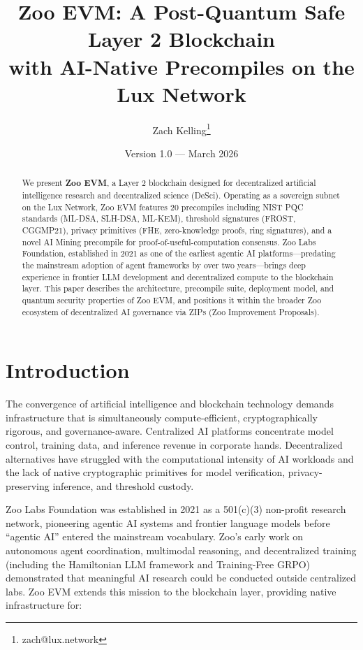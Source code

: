 \documentclass[11pt,a4paper]{article}
\title{\textbf{Zoo EVM: A Post-Quantum Safe Layer 2 Blockchain\\with AI-Native Precompiles on the Lux Network}}
\author[1]{Zach Kelling\thanks{zach@lux.network}}
\affil[1]{\textit{Zoo Labs Foundation \quad Hanzo Industries \quad Lux Industries}, \texttt{research@zoo.ngo}}
\date{Version 1.0 --- March 2026}
\begin{document}
\zoocoverpage

\begin{abstract}
We present \textbf{Zoo EVM}, a Layer 2 blockchain designed for decentralized artificial intelligence research and decentralized science (DeSci). Operating as a sovereign subnet on the Lux Network, Zoo EVM features 20 precompiles including NIST PQC standards (ML-DSA, SLH-DSA, ML-KEM), threshold signatures (FROST, CGGMP21), privacy primitives (FHE, zero-knowledge proofs, ring signatures), and a novel AI Mining precompile for proof-of-useful-computation consensus. Zoo Labs Foundation, established in 2021 as one of the earliest agentic AI platforms---predating the mainstream adoption of agent frameworks by over two years---brings deep experience in frontier LLM development and decentralized compute to the blockchain layer. This paper describes the architecture, precompile suite, deployment model, and quantum security properties of Zoo EVM, and positions it within the broader Zoo ecosystem of decentralized AI governance via ZIPs (Zoo Improvement Proposals).
\end{abstract}

\section{Introduction}

The convergence of artificial intelligence and blockchain technology demands infrastructure that is simultaneously compute-efficient, cryptographically rigorous, and governance-aware. Centralized AI platforms concentrate model control, training data, and inference revenue in corporate hands. Decentralized alternatives have struggled with the computational intensity of AI workloads and the lack of native cryptographic primitives for model verification, privacy-preserving inference, and threshold custody.

Zoo Labs Foundation was established in 2021 as a 501(c)(3) non-profit research network, pioneering agentic AI systems and frontier language models before ``agentic AI'' entered the mainstream vocabulary. Zoo's early work on autonomous agent coordination, multimodal reasoning, and decentralized training (including the Hamiltonian LLM framework and Training-Free GRPO) demonstrated that meaningful AI research could be conducted outside centralized labs. Zoo EVM extends this mission to the blockchain layer, providing native infrastructure for:
\end{document}
